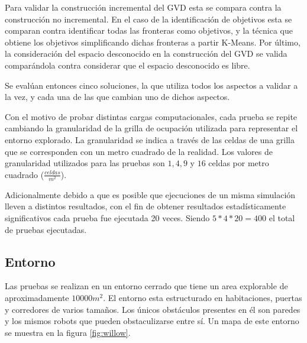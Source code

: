 Para validar la construcción incremental del GVD esta se compara contra la
construcción no incremental. En el caso de la identificación de objetivos esta se
comparan contra identificar todas las fronteras como objetivos, y la técnica
que obtiene los objetivos simplificando dichas fronteras a partir K-Means. Por
último, la consideración del espacio desconocido en la construcción del GVD se
valida comparándola contra considerar que el espacio desconocido es libre. 

Se evalúan entonces cinco soluciones, la que utiliza todos los aspectos a
validar a la vez, y cada una de las que cambian uno de dichos aspectos.

Con el motivo de probar distintas cargas computacionales, cada prueba se repite
cambiando la granularidad de la grilla de ocupación utilizada para representar
el entorno explorado. La granularidad se indica a través de las celdas de una
grilla que se corresponden con un metro cuadrado de la realidad. Los valores de
granularidad utilizados para las pruebas son $1,4,9$ y $16$ celdas
por metro cuadrado ($\frac{celdas}{m^2}$). 

Adicionalmente debido a que es posible que ejecuciones de un misma simulación
lleven a distintos resultados, con el fin de obtener resultados
estadísticamente significativos cada prueba fue ejecutada 20 veces. Siendo 
$5*4*20=400$ el total de pruebas ejecutadas.


\subsection{Entorno}
Las pruebas se realizan en un entorno cerrado que tiene un area explorable de
aproximadamente $10000m^2$. El entorno esta estructurado en habitaciones,
puertas y corredores de varios tamaños. Los únicos obstáculos presentes en él
son paredes y los mismos robots que pueden obstaculizarse entre
sí. Un mapa de este entorno se muestra en la figura
\ref{fig:willow}.

